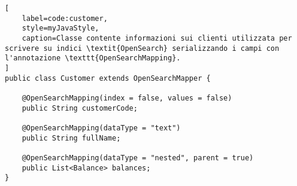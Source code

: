 \begin{lstlisting}[
    label=code:customer,
    style=myJavaStyle,
    caption=Classe contente informazioni sui clienti utilizzata per scrivere su indici \textit{OpenSearch} serializzando i campi con l'annotazione \texttt{OpenSearchMapping}.
]
public class Customer extends OpenSearchMapper {

    @OpenSearchMapping(index = false, values = false)
    public String customerCode;

    @OpenSearchMapping(dataType = "text")
    public String fullName;

    @OpenSearchMapping(dataType = "nested", parent = true)
    public List<Balance> balances;
}
\end{lstlisting}